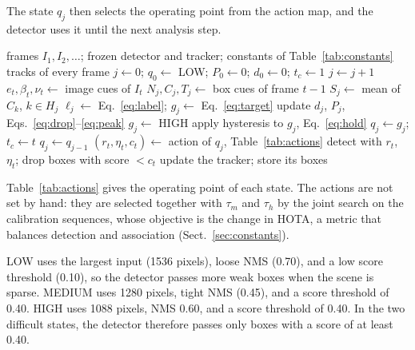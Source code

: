 \documentclass[pdflatex,sn-mathphys-num,iicol]{sn-jnl}
\makeatletter
\def\subsectionfont{\reset@font\fontfamily{\rmdefault}\fontsize{10bp}{12bp}\bfseries\selectfont\raggedright\boldmath}
\renewcommand\subsection{\@startsection{subsection}{2}{\z@}{-7pt \@plus -2pt \@minus -2pt}{3pt}{\subsectionfont}}
\makeatother
\begin{document}
The state $q_j$ then selects the operating point from the action map, and the
detector uses it until the next analysis step.

\begin{algorithm}[t]
\caption{AC-MOT controller for one video. Steps 1--4 are those of
Sect.~\ref{sec:states}. The state is kept between analysis steps, and the
boxes stored at frame $t$ are used from frame $t+1$.}\label{alg:controller}
\begin{algorithmic}[1]
\Require frames $I_1, I_2, \dots$; frozen detector and tracker; constants of Table~\ref{tab:constants}
\Ensure tracks of every frame
\State $j\gets0$; $q_0\gets$ LOW; $P_0\gets0$; $d_0\gets0$; $t_c\gets1$
   
    \State $j\gets j+1$
    \State $e_t,\beta_t,\nu_t\gets$ image cues of $I_t$ 
    \State $N_j,C_j,T_j\gets$ box cues of frame $t-1$ 
    \State $S_j\gets$ mean of $C_k$, $k\in H_j$ 
    \State $\ell_j\gets$ Eq.~\eqref{eq:label}; $g_j\gets$ Eq.~\eqref{eq:target} 
    \State update $d_j$, $P_j$, Eqs.~\eqref{eq:drop}--\eqref{eq:peak}
     $g_j\gets$ HIGH 
    \EndIf
    \State apply hysteresis to $g_j$, Eq.~\eqref{eq:hold} 
     
      \State $q_j\gets g_j$; $t_c\gets t$
    \Else
      \State $q_j\gets q_{j-1}$
    \EndIf
  \EndIf
  \State $(r_t,\eta_t,c_t)\gets$ action of $q_j$, Table~\ref{tab:actions}
  \State detect with $r_t$, $\eta_t$; drop boxes with score $<c_t$
  \State update the tracker; store its boxes
\EndFor
\end{algorithmic}
\end{algorithm}

\subsection{Action map}\label{sec:actions}
Table~\ref{tab:actions} gives the operating point of each state. The actions
are not set by hand: they are selected together with $\tau_m$ and $\tau_h$
by the joint search on the calibration sequences, whose objective is the
change in HOTA, a metric that balances detection and association
(Sect.~\ref{sec:constants}).

LOW uses the largest input (1536 pixels), loose NMS (0.70), and a low score
threshold (0.10), so the detector passes more weak boxes when the scene is
sparse. MEDIUM uses 1280 pixels, tight NMS (0.45), and a score threshold of
0.40. HIGH uses 1088 pixels, NMS 0.60, and a score threshold of 0.40. In the
two difficult states, the detector therefore passes only boxes with a score of
at least 0.40.
\end{document}

